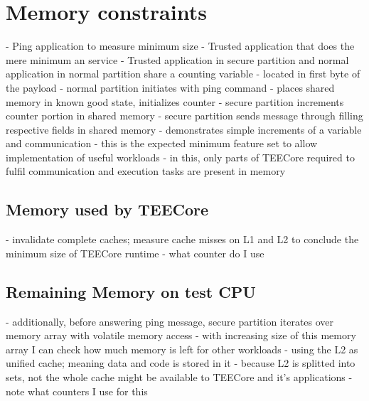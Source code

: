 \section{Memory constraints}
- Ping application to measure minimum size
- Trusted application that does the mere minimum an service
- Trusted application in secure partition and normal application in normal partition share a counting variable
- located in first byte of the payload
- normal partition initiates with ping command
- places shared memory in known good state, initializes counter
- secure partition increments counter portion in shared memory
- secure partition sends message through filling respective fields in shared memory
- demonstrates simple increments of a variable and communication
- this is the expected minimum feature set to allow implementation of useful workloads
- in this, only parts of TEECore required to fulfil communication and execution tasks are present in memory
\subsection{Memory used by TEECore}
- invalidate complete caches; measure cache misses on L1 and L2 to conclude the minimum size of TEECore runtime
- what counter do I use
\subsection{Remaining Memory on test CPU}
- additionally, before answering ping message, secure partition iterates over memory array with volatile memory access
- with increasing size of this memory array I can check how much memory is left for other workloads
- using the L2 as unified cache; meaning data and code is stored in it
- because L2 is splitted into sets, not the whole cache might be available to TEECore and it's applications
- note what counters I use for this
\cleardoublepage

